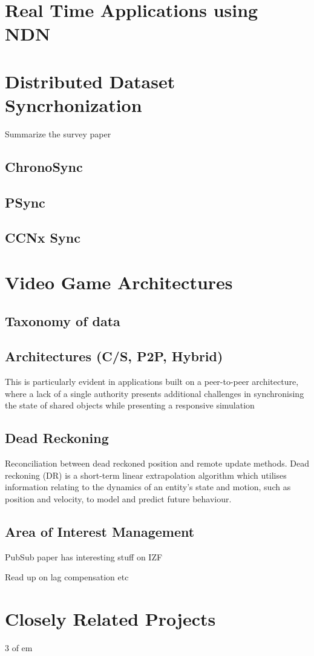 \section{Real Time Applications using NDN}

\section{Distributed Dataset Syncrhonization}
Summarize the survey paper
\subsection{ChronoSync}
\subsection{PSync}
\subsection{CCNx Sync}

\section{Video Game Architectures}
\subsection{Taxonomy of data}
\subsection{Architectures (C/S, P2P, Hybrid)}
This is particularly evident in
applications built on a peer-to-peer architecture,
where a lack of a single authority presents additional
challenges in synchronising the state of shared
objects while presenting a responsive simulation \cite{dead-reckoning}
\subsection{Dead Reckoning}
Reconciliation between dead reckoned position and remote update methods. Dead reckoning (DR) is a short-term linear
extrapolation algorithm which utilises information
relating to the dynamics of an entity’s state and
motion, such as position and velocity, to model and
predict future behaviour. \cite{dead-reckoning}
\subsection{Area of Interest Management}
PubSub paper has interesting stuff on IZF

Read up on lag compensation etc

\section{Closely Related Projects}
3 of em

